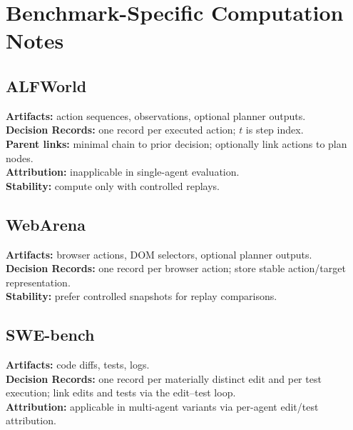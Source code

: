 \section{Benchmark-Specific Computation Notes}
\label{app:benchmarks}

\subsection{ALFWorld}
\textbf{Artifacts:} action sequences, observations, optional planner outputs. \\
\textbf{Decision Records:} one record per executed action; $t$ is step index. \\
\textbf{Parent links:} minimal chain to prior decision; optionally link actions to plan nodes. \\
\textbf{Attribution:} inapplicable in single-agent evaluation. \\
\textbf{Stability:} compute only with controlled replays.

\subsection{WebArena}
\textbf{Artifacts:} browser actions, DOM selectors, optional planner outputs. \\
\textbf{Decision Records:} one record per browser action; store stable action/target representation. \\
\textbf{Stability:} prefer controlled snapshots for replay comparisons.

\subsection{SWE-bench}
\textbf{Artifacts:} code diffs, tests, logs. \\
\textbf{Decision Records:} one record per materially distinct edit and per test execution; link edits and tests via the edit--test loop. \\
\textbf{Attribution:} applicable in multi-agent variants via per-agent edit/test attribution.

